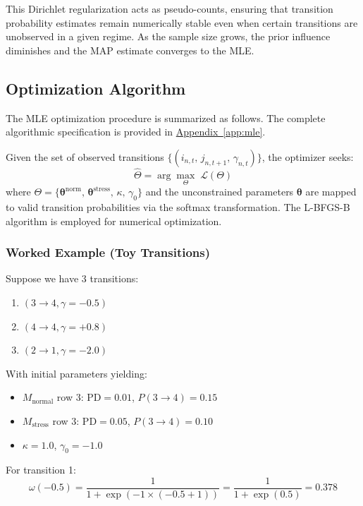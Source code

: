 \documentclass[12pt,a4paper]{article}
\newcommand{\Mnormal}{M_{\text{normal}}}
\newcommand{\Mstress}{M_{\text{stress}}}
\newcommand{\PD}{\text{PD}}
\begin{document}
This Dirichlet regularization acts as pseudo-counts, ensuring that transition probability estimates remain numerically stable even when certain transitions are unobserved in a given regime. As the sample size grows, the prior influence diminishes and the MAP estimate converges to the MLE.

\subsection{Optimization Algorithm}

The MLE optimization procedure is summarized as follows. The complete algorithmic specification is provided in \hyperref[app:mle]{Appendix~\ref*{app:mle}}.

Given the set of observed transitions $\{(i_{n,t},\, j_{n,t+1},\, \gamma_{n,t})\}$, the optimizer seeks:
\begin{equation}
\hat{\Theta} = \arg\max_{\Theta} \; \mathcal{L}(\Theta)
\end{equation}
where $\Theta = \{\boldsymbol{\theta}^{\text{norm}},\, \boldsymbol{\theta}^{\text{stress}},\, \kappa,\, \gamma_0\}$ and the unconstrained parameters $\boldsymbol{\theta}$ are mapped to valid transition probabilities via the softmax transformation. The L-BFGS-B algorithm is employed for numerical optimization.

\subsubsection*{Worked Example (Toy Transitions)}

Suppose we have 3 transitions:
\begin{enumerate}[noitemsep]
    \item $(3 \to 4, \gamma = -0.5)$
    \item $(4 \to 4, \gamma = +0.8)$
    \item $(2 \to 1, \gamma = -2.0)$
\end{enumerate}

With initial parameters yielding:
\begin{itemize}[noitemsep]
    \item $\Mnormal$ row 3: $\PD = 0.01$, $P(3 \to 4) = 0.15$
    \item $\Mstress$ row 3: $\PD = 0.05$, $P(3 \to 4) = 0.10$
    \item $\kappa = 1.0$, $\gamma_0 = -1.0$
\end{itemize}

For transition 1: 
\begin{equation*}
\omega(-0.5) = \frac{1}{1 + \exp(-1 \times (-0.5 + 1))} = \frac{1}{1 + \exp(0.5)} = 0.378
\end{equation*}
\end{document}
